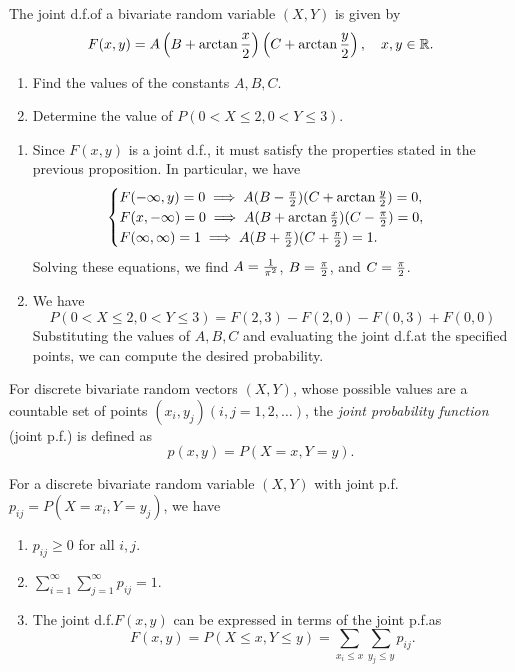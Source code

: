 \begin{example}
  The joint d.f.\@ of a bivariate random variable \((X, Y)\) is given by
  \[
    F(x, y) = A \left(B + \arctan\frac{x}{2}\right) \left(C + \arctan\frac{y}{2}\right), \quad x, y \in \mathbb{R}.
  \]
  \begin{enumerate}
    \item Find the values of the constants \(A, B, C\).
    \item Determine the value of \(P(0 < X \leq 2, 0 < Y \leq 3)\).
  \end{enumerate}
\end{example}
\begin{solution}
  \begin{enumerate}
    \item Since \(F(x, y)\) is a joint d.f.\@, it must satisfy the properties stated in the previous proposition. In particular, we have
    \[
      \begin{cases}
        F(-\infty, y) = 0 \implies A (B - \frac{\mathrm{\pi}}{2}) (C + \arctan\frac{y}{2}) = 0, \\
        F(x, -\infty) = 0 \implies A (B + \arctan\frac{x}{2}) (C - \frac{\mathrm{\pi}}{2}) = 0, \\
        F(\infty, \infty) = 1 \implies A (B + \frac{\mathrm{\pi}}{2}) (C + \frac{\mathrm{\pi}}{2}) = 1.
      \end{cases}
    \]
    Solving these equations, we find \(A = \frac{1}{\mathrm{\pi}^2}\), \(B = \frac{\mathrm{\pi}}{2}\), and \(C = \frac{\mathrm{\pi}}{2}\).
    \item We have
    \[
      P(0 < X \leq 2, 0 < Y \leq 3) = F(2, 3) - F(2, 0) - F(0, 3) + F(0, 0)
    \]
    Substituting the values of \(A, B, C\) and evaluating the joint d.f.\@ at the specified points, we can compute the desired probability. \qedhere
  \end{enumerate}
\end{solution}

\begin{definition}
  For discrete bivariate random vectors \((X, Y)\), whose possible values are a countable set of points \((x_i, y_j) (i, j = 1, 2, \dots)\), the \emph{joint probability function} (joint p.f.\@) is defined as
  \[
    p(x, y) = P(X = x, Y = y).
  \]
\end{definition}

\begin{proposition}
  For a discrete bivariate random variable \((X, Y)\) with joint p.f.\@ \(p_{ij} = P(X = x_i, Y = y_j)\), we have
  \begin{enumerate}
    \item \(p_{ij} \geq 0\) for all \(i, j\).
    \item \(\sum_{i=1}^\infty \sum_{j=1}^\infty p_{ij} = 1\).
    \item The joint d.f.\@ \(F(x, y)\) can be expressed in terms of the joint p.f.\@ as
    \[
      F(x, y) = P(X \leq x, Y \leq y) = \sum_{x_i \leq x} \sum_{y_j \leq y} p_{ij}.
    \]
  \end{enumerate}
\end{proposition}


